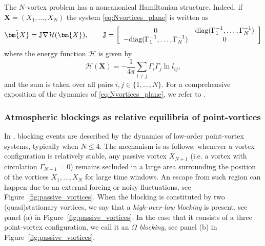 \documentclass[a4paper]{article}
\numberwithin{equation}{section}
\begin{document}
The $N$-vortex problem has a noncanonical Hamiltonian structure. Indeed, if $\bm{X}=(X_1,\ldots,X_N)$ the system  \eqref{eq:Nvortices_plane} is written as
\[
\dot{\bm{X}} = \mathbb{J} \nabla \mathcal{H} (\bm{X}), \qquad \mathbb{J} = \left[ \begin{array}{cc}
    0 & \textup{diag}(\Gamma_1^{-1},\ldots,\Gamma_N^{-1}) \\
    -\textup{diag}(\Gamma_1^{-1},\ldots,\Gamma_N^{-1}) & 0
\end{array} \right]
\]
where the energy function $\mathcal{H}$ is given by
\begin{equation}
    \label{eq:Energy_Nvortex}
    \mathcal{H}(\bm{X}) = -\frac{1}{4\pi}\sum_{
          i\neq j} \Gamma_i\Gamma_j \ln l_{ij},
\end{equation}
and the sum is taken over all pairs $i,j\in\{1,\ldots,N\}$. For a comprehensive exposition of the dynamics of \eqref{eq:Nvortices_plane}, we refer to \cite{Newton01}.

\subsubsection{Atmospheric blockings as relative equilibria of point-vortices}

In \cite{Kuhlbrodt00}, blocking events are described by the dynamics of low-order point-vortex systems, typically when $N\leq4$. The mechanism is as follows: whenever a vortex configuration is relatively stable, any passive vortex $X_{N+1}$ (i.e. a vortex with circulation $\Gamma_{N+1}=0$) remains secluded in a large area surrounding the position of the vortices $X_1,\ldots, X_N$ for large time windows. An escape from such region can happen due to an external forcing or noisy fluctuations, see Figure~\ref{fig:passive_vortices}.  When the blocking is constituted by two (quasi)stationary vortices, we say that a \textit{high-over-low blocking} is present, see panel (a) in Figure~\ref{fig:passive_vortices}. In the case that it consists of a three point-vortex configuration, we call it an \textit{$\Omega$ blocking}, see panel (b) in Figure~\ref{fig:passive_vortices}.
\end{document}
